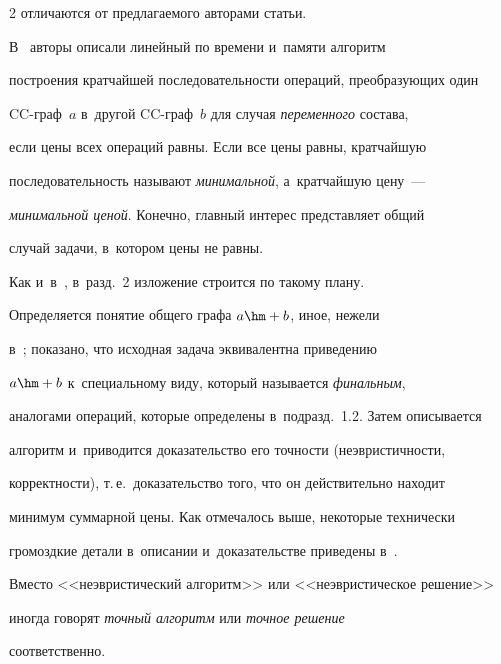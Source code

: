 \begin{multicols}{2}
отличаются от предлагаемого авторами статьи.


{





} 


  


  В~\cite{2-gor} авторы описали линейный по времени и~памяти алгоритм 


построения кратчайшей последовательности операций, преобразующих один 


CC-граф~$a$ в~другой CC-граф~$b$ для случая \textit{переменного} состава, 


если цены всех операций равны. Если все цены равны, кратчайшую 


последовательность называют \textit{минимальной}, а~кратчайшую цену~--- 


\textit{минимальной ценой}. Конечно, главный интерес представляет общий 


случай задачи, в~котором цены не равны. 





  


  Как и~в~\cite{2-gor}, в~разд.~2 изложение строится по такому плану. 


Определяется понятие общего графа $a\hm+b$, иное, нежели  


в~\cite{4-gor, 5-gor}; показано, что исходная задача эквивалентна приведению 


$a\hm+b$ к~специальному виду, который называется \textit{финальным}, 


аналогами операций, которые определены в~подразд.~1.2. Затем описывается 


алгоритм и~приводится доказательство его точности (неэвристичности, 


корректности), т.\,е.\ доказательство того, что он действительно находит 


минимум суммарной цены. Как отмечалось выше, некоторые технически 


громоздкие детали в~описании и~доказательстве приведены в~\cite{1-gor}. 


Вместо <<неэвристический алгоритм>> или <<неэвристическое решение>> 


иногда говорят \textit{точный алгоритм} или \textit{точное решение} 


соответственно.






\end{multicols}
